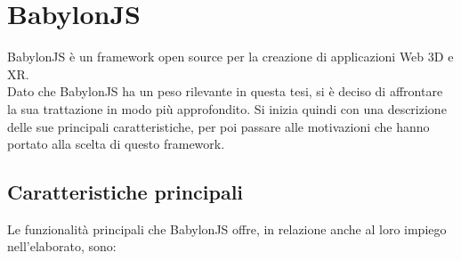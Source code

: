 \section{BabylonJS}\label{sec:BabylonJS}
BabylonJS è un framework open source per la creazione di applicazioni Web 3D e XR\cite{BabylonJS}.\\
Dato che BabylonJS ha un peso rilevante in questa tesi, si è deciso di affrontare la sua trattazione in modo più approfondito. Si inizia quindi con una descrizione delle sue principali caratteristiche, per poi passare alle motivazioni che hanno portato alla scelta di questo framework.\\

\subsection{Caratteristiche principali}\label{subsec:BabylonJS_caratteristiche}
Le funzionalità principali che BabylonJS offre, in relazione anche al loro impiego nell'elaborato, sono:
